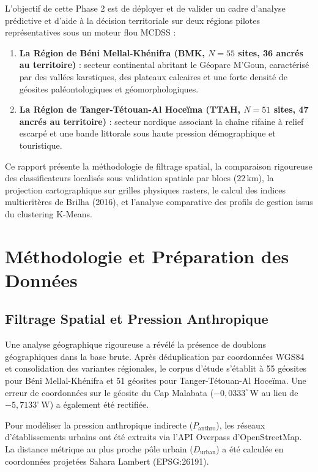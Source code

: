 \documentclass[11pt,twocolumn,a4paper]{article}
\begin{document}
L'objectif de cette Phase 2 est de déployer et de valider un cadre d'analyse prédictive et d'aide à la décision territoriale sur deux régions pilotes représentatives sous un moteur flou MCDSS :
\begin{enumerate}
    \item \textbf{La Région de Béni Mellal-Khénifra (BMK, $N=55$ sites, 36 ancrés au territoire)} : secteur continental abritant le Géoparc M'Goun, caractérisé par des vallées karstiques, des plateaux calcaires et une forte densité de géosites paléontologiques et géomorphologiques.
    \item \textbf{La Région de Tanger-Tétouan-Al Hoceïma (TTAH, $N=51$ sites, 47 ancrés au territoire)} : secteur nordique associant la chaîne rifaine à relief escarpé et une bande littorale sous haute pression démographique et touristique.
\end{enumerate}

Ce rapport présente la méthodologie de filtrage spatial, la comparaison rigoureuse des classificateurs localisés sous validation spatiale par blocs ($22\,\text{km}$), la projection cartographique sur grilles physiques rasters, le calcul des indices multicritères de Brilha (2016), et l'analyse comparative des profils de gestion issus du clustering K-Means.

\section{Méthodologie et Préparation des Données}

\subsection{Filtrage Spatial et Pression Anthropique}
Une analyse géographique rigoureuse a révélé la présence de doublons géographiques dans la base brute. Après déduplication par coordonnées WGS84 et consolidation des variantes régionales, le corpus d'étude s'établit à 55 géosites pour Béni Mellal-Khénifra et 51 géosites pour Tanger-Tétouan-Al Hoceïma. Une erreur de coordonnées sur le géosite du Cap Malabata ($-0,0333^\circ\,\text{W}$ au lieu de $-5,7133^\circ\,\text{W}$) a également été rectifiée.

Pour modéliser la pression anthropique indirecte ($P_{\text{anthro}}$), les réseaux d'établissements urbains ont été extraits via l'API Overpass d'OpenStreetMap. La distance métrique au plus proche pôle urbain ($D_{\text{urban}}$) a été calculée en coordonnées projetées Sahara Lambert (EPSG:26191).
\end{document}
